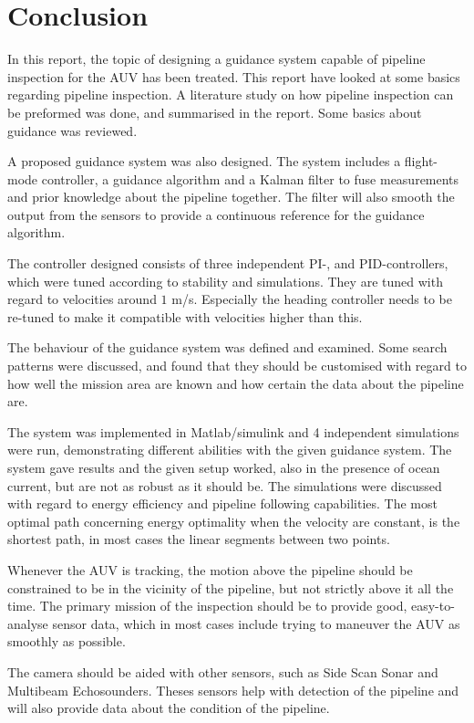 \chapter{Conclusion}
	In this report, the topic of designing a guidance system capable of pipeline inspection 
	for the \hugin AUV has been treated. This report have looked at some basics regarding pipeline
	inspection. A literature study on how pipeline inspection can be preformed was done, and summarised in
	the report. Some basics about guidance was reviewed.

	A proposed guidance system was also designed. The system includes a flight-mode controller, a
	guidance algorithm and a Kalman filter to fuse measurements and prior knowledge about the pipeline
	together. The filter will also smooth the output from the sensors to provide a continuous reference
	for the guidance algorithm. 

	The controller designed consists of three independent PI-, and PID-controllers, which were tuned according to
	stability and simulations. They are tuned with regard to velocities around $1$ m/s. Especially the heading
	controller needs to be re-tuned to make it compatible with velocities higher than this.

	The behaviour of the guidance system was defined and examined. Some search patterns were discussed,
	and found that they should be customised with regard to how well the mission area are known and how
	certain the data about the pipeline are. 
	
	The system was implemented in Matlab/simulink and 4 independent simulations were run, demonstrating
	different abilities with the given guidance system. The system gave results and the given setup
	worked, also in the presence of ocean current, but are not as robust as it should be. The simulations
	were discussed with regard to energy
	efficiency and pipeline following capabilities. The most optimal path concerning energy
	optimality when the velocity are constant, is the shortest path, in most cases the linear segments
	between two points. 
	
	Whenever the AUV is tracking, the motion above the pipeline should be constrained to be in the
	vicinity of the pipeline, but not strictly above it all the time. The primary mission of the inspection
	should be to provide good, easy-to-analyse sensor data, which in most cases include trying to maneuver 
	the AUV as smoothly as possible. 

	The camera should be aided with other sensors, such as Side Scan Sonar and Multibeam Echosounders.
	Theses sensors help with detection of the pipeline and will also provide data about the condition of
	the pipeline. 


